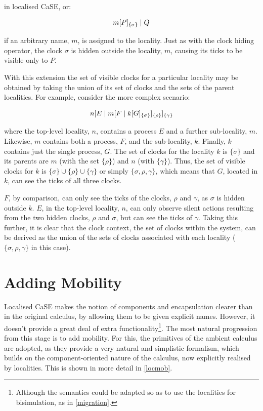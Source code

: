 \noindent in localised CaSE, or:

\begin{equation}
  {m}[ P ]_{\{\sigma\}}\;|\;Q
\end{equation}

\noindent if an arbitrary name, $m$, is assigned to the locality.  Just
as with the clock hiding operator, the clock $\sigma$ is hidden outside
the locality, $m$, causing its ticks to be visible only to $P$.  

With this extension the set of visible clocks for a particular locality
may be obtained by taking the union of its set of clocks and the sets of
the parent localities.  For example, consider the more complex scenario:

\begin{equation}
{n}[ E\;|\;{m}[ F\;|\;{k}[ G ]_{\{\sigma\}} ]_{\{\rho\}} ]_{\{\gamma\}}
\end{equation}

\noindent where the top-level locality, $n$, contains a process $E$ and
a further sub-locality, $m$.  Likewise, $m$ contains both a process,
$F$, and the sub-locality, $k$.  Finally, $k$ contains just the single
process, $G$.  The set of clocks for the locality $k$ is $\{\sigma\}$
and its parents are $m$ (with the set $\{\rho\}$) and $n$ (with
$\{\gamma\}$).  Thus, the set of visible clocks for $k$ is $\{\sigma\}
\cup \{\rho\} \cup \{\gamma\}$ or simply $\{\sigma, \rho, \gamma\}$,
which means that $G$, located in $k$, can see the ticks of all three
clocks.

$F$, by comparison, can only see the ticks of the clocks, $\rho$ and
$\gamma$, as $\sigma$ is hidden outside $k$.  $E$, in the top-level
locality, $n$, can only observe silent actions resulting from the two
hidden clocks, $\rho$ and $\sigma$, but can see the ticks of $\gamma$.
Taking this further, it is clear that the clock context, the set of
clocks within the system, can be derived as the union of the sets of
clocks associated with each locality ($\{\sigma, \rho, \gamma\}$ in
this case).

\section{Adding Mobility}
\label{addingmob}

Localised CaSE makes the notion of components and encapsulation clearer
than in the original calculus, by allowing them to be given explicit
names.  However, it doesn't provide a great deal of extra
functionality\footnote{Although the semantics could be adapted so as to
use the localities for bisimulation, as in \ref{migration}.}.  The most
natural progression from this stage is to add mobility.  For this, the
primitives of the ambient calculus are adopted, as they provide a very
natural and simplistic formalism, which builds on the component-oriented
nature of the calculus, now explicitly realised by localities.  This is
shown in more detail in \ref{locmob}.

